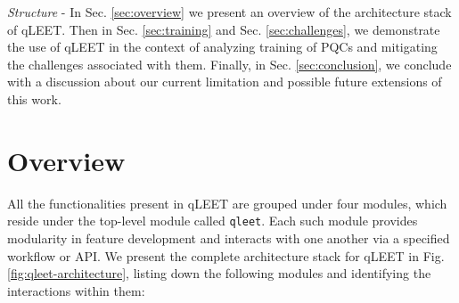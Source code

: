 \textit{Structure} - In Sec. \ref{sec:overview} we present an overview of the architecture stack of qLEET. Then in Sec. \ref{sec:training} and Sec. \ref{sec:challenges}, we demonstrate the use of qLEET in the context of analyzing training of PQCs and mitigating the challenges associated with them. Finally, in Sec. \ref{sec:conclusion}, we conclude with a discussion about our current limitation and possible future extensions of this work.

\section{\label{sec:overview}Overview}

All the functionalities present in qLEET are grouped under four modules, which reside under the top-level module called \texttt{qleet}. Each such module provides modularity in feature development and interacts with one another via a specified workflow or API. We present the complete architecture stack for qLEET in Fig. \ref{fig:qleet-architecture}, listing down the following modules and identifying the interactions within them:

